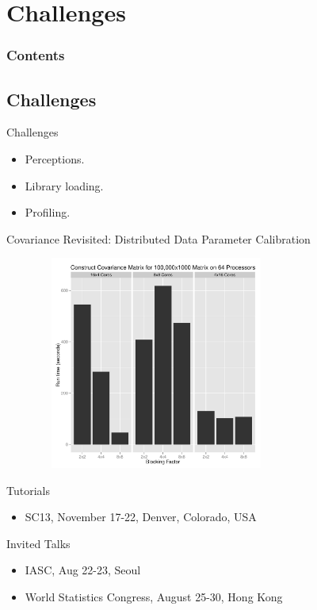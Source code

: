 \section{Challenges}

\hidenum
\begin{frame}[noframenumbering]
\frametitle{Contents}
\end{frame}
\shownum


\subsection{Challenges}

\begin{frame}
  \begin{block}{Challenges}
    \begin{itemize}[<+-|alert@+>]
      \item Perceptions.
      \item Library loading.
      \item Profiling.
    \end{itemize}
  \end{block}
\end{frame}


\begin{frame}
  \begin{block}{Covariance Revisited: Distributed Data Parameter Calibration}
    \begin{center}
     \includegraphics[width=10cm, height=7cm]{pics/cov_param}
    \end{center}
  \end{block}
\end{frame}

\begin{frame}
  \begin{block}{Tutorials}
  \begin{itemize}
    \item {\small SC13, November 17-22, Denver, Colorado, USA }
  \end{itemize}
  \end{block}
  \begin{block}{Invited Talks}
  \begin{itemize}
    \item {\small IASC, Aug 22-23, Seoul}
    \item {\small World Statistics Congress, August 25-30, Hong Kong }
  \end{itemize}
  \end{block}
\end{frame}
  
